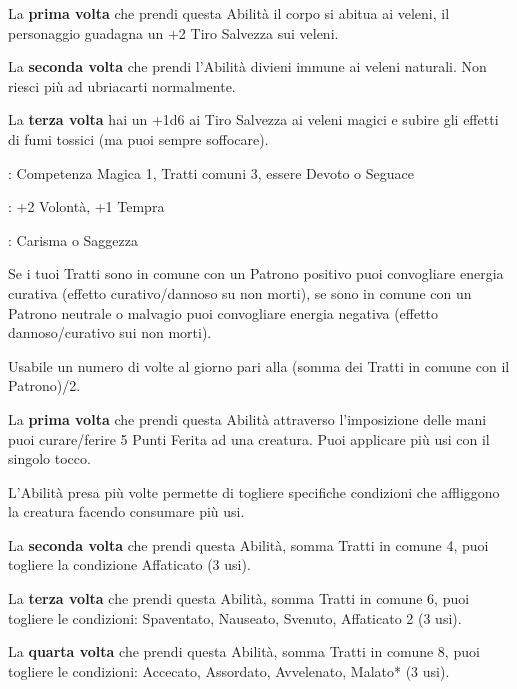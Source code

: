 \begin{multicols}{2}

La \textbf{prima volta} che prendi questa Abilità il corpo si abitua ai veleni, il personaggio guadagna un +2 Tiro Salvezza sui veleni.

La \textbf{seconda volta} che prendi l'Abilità divieni immune ai veleni naturali. Non riesci più ad ubriacarti normalmente.

La \textbf{terza volta} hai un +1d6 ai Tiro Salvezza ai veleni magici e subire gli effetti di fumi tossici (ma puoi sempre soffocare).

\medskip


\begin{description}[noitemsep, topsep=0pt, parsep=0pt, partopsep=0pt, leftmargin=0cm, labelwidth=2.5cm]
    \item[\textbf{Requisito}]: Competenza Magica 1, Tratti comuni 3, essere Devoto o Seguace
    \item[\textbf{Tiri Salvezza}]: +2 Volontà, +1 Tempra
    \item[\textbf{Caratteristica}]: Carisma o Saggezza
\end{description}

Se i tuoi Tratti sono in comune con un Patrono positivo puoi convogliare energia curativa (effetto curativo/dannoso su non morti), se sono in comune con un Patrono neutrale o malvagio puoi convogliare energia negativa (effetto dannoso/curativo sui non morti).

Usabile un numero di volte al giorno pari alla (somma dei Tratti in comune con il Patrono)/2.

La \textbf{prima volta} che prendi questa Abilità attraverso l'imposizione delle mani puoi curare/ferire 5 Punti Ferita ad una creatura. Puoi applicare più usi con il singolo tocco.

L'Abilità presa più volte permette di togliere specifiche condizioni che affliggono la creatura facendo consumare più usi.

La \textbf{seconda volta} che prendi questa Abilità, somma Tratti in comune 4, puoi togliere la condizione Affaticato (3 usi).

La \textbf{terza volta} che prendi questa Abilità, somma Tratti in comune 6, puoi togliere le condizioni: Spaventato, Nauseato, Svenuto, Affaticato 2 (3 usi).

La \textbf{quarta volta} che prendi questa Abilità, somma Tratti in comune 8, puoi togliere le condizioni: Accecato, Assordato, Avvelenato, Malato* (3 usi).


\end{multicols}
